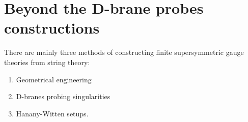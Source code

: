 \section{Beyond the D-brane probes constructions}

    There are mainly three methods of constructing finite supersymmetric gauge theories from string theory:
    \begin{enumerate}
        \item Geometrical engineering
        \item D-branes probing singularities
        \item Hanany-Witten setups.
    \end{enumerate}